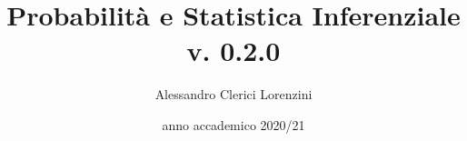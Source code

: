 \documentclass[a4paper]{article}
\begin{document}
\title{Probabilità e Statistica Inferenziale\\{\small v. 0.2.0}}
\author{Alessandro Clerici Lorenzini}
\date{anno accademico 2020/21}
\maketitle
\tableofcontents









\end{document}
